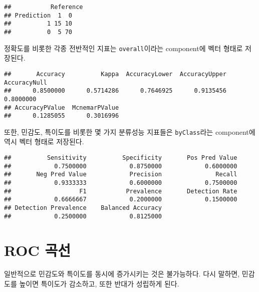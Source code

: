 \documentclass[]{book}
\newenvironment{Shaded}{\begin{snugshade}}{\end{snugshade}}
\newcommand{\NormalTok}[1]{#1}
\newcommand{\OperatorTok}[1]{\textcolor[rgb]{0.81,0.36,0.00}{\textbf{#1}}}
\begin{document}
\begin{verbatim}
##           Reference
## Prediction  1  0
##          1 15 10
##          0  5 70
\end{verbatim}

정확도를 비롯한 각종 전반적인 지표는 \texttt{overall}이라는 component에 벡터 형태로 저장된다.

\begin{Shaded}
\end{Shaded}

\begin{verbatim}
##       Accuracy          Kappa  AccuracyLower  AccuracyUpper   AccuracyNull 
##      0.8500000      0.5714286      0.7646925      0.9135456      0.8000000 
## AccuracyPValue  McnemarPValue 
##      0.1285055      0.3016996
\end{verbatim}

또한, 민감도, 특이도를 비롯한 몇 가지 분류성능 지표들은 \texttt{byClass}라는 component에 역시 벡터 형태로 저장된다.

\begin{Shaded}
\end{Shaded}

\begin{verbatim}
##          Sensitivity          Specificity       Pos Pred Value 
##            0.7500000            0.8750000            0.6000000 
##       Neg Pred Value            Precision               Recall 
##            0.9333333            0.6000000            0.7500000 
##                   F1           Prevalence       Detection Rate 
##            0.6666667            0.2000000            0.1500000 
## Detection Prevalence    Balanced Accuracy 
##            0.2500000            0.8125000
\end{verbatim}

\hypertarget{roc-curve}{%
\section{ROC 곡선}\label{roc-curve}}

일반적으로 민감도와 특이도를 동시에 증가시키는 것은 불가능하다. 다시 말하면, 민감도를 높이면 특이도가 감소하고, 또한 반대가 성립하게 된다.
\end{document}
